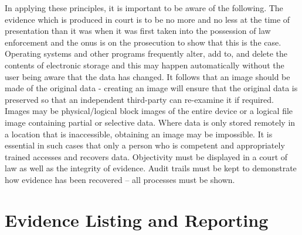 \documentclass[12pt]{article}
\begin{document}
In applying these principles, it is important to be aware of the following. The evidence which is produced in court is to be no more and no less at the time of presentation than it was when it was first taken into the possession of law enforcement and the onus is on the prosecution to show that this is the case. Operating systems and other programs frequently alter, add to, and delete the contents of electronic storage and this may happen automatically without the user being aware that the data has changed. It follows that an image should be made of the original data - creating an image will ensure that the original data is preserved so that an independent third-party can re-examine it if required. Images may be physical/logical block images of the entire device or a logical file image containing partial or selective data. Where data is only stored remotely in a location that is inaccessible, obtaining an image may be impossible. It is essential in such cases that only a person who is competent and appropriately trained accesses and recovers data. Objectivity must be displayed in a court of law as well as the integrity of evidence. Audit trails must be kept to demonstrate how evidence has been recovered -- all processes must be shown.
\pagebreak
\section{Evidence Listing and Reporting}
\end{document}
